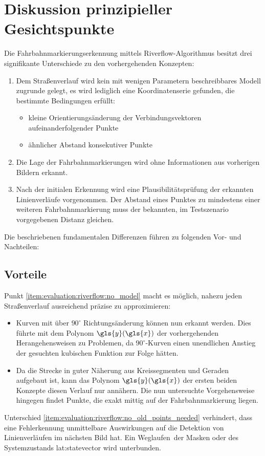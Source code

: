 \section{Diskussion prinzipieller Gesichtspunkte \dcsecondauthorshort} 
Die Fahrbahnmarkierungserkennung mittels Riverflow-Algorithmus besitzt drei signifikante Unterschiede zu den vorhergehenden Konzepten:
\begin{enumerate}
\item \label{item:evaluation:riverflow:no_model}
Dem Straßenverlauf wird kein mit wenigen Parametern beschreibbares Modell zugrunde gelegt, es wird lediglich eine Koordinatenserie gefunden, die bestimmte Bedingungen erfüllt:
\begin{itemize}
\item kleine Orientierungsänderung der Verbindungsvektoren aufeinanderfolgender Punkte
\item ähnlicher Abstand konsekutiver Punkte
\end{itemize}
\item \label{item:evaluation:riverflow:no_old_points_needed}
Die Lage der Fahrbahnmarkierungen wird ohne Informationen aus vorherigen Bildern erkannt.
\item \label{item:evaluation:riverflow:verification}
Nach der initialen Erkennung wird eine Plausibilitätsprüfung der erkannten Linienverläufe vorgenommen. Der Abstand eines Punktes zu mindestens einer weiteren Fahrbahnmarkierung muss der bekannten, im Testszenario vorgegebenen Distanz gleichen. 
\end{enumerate}
Die beschriebenen fundamentalen Differenzen führen zu folgenden Vor- und Nachteilen:

\subsection{Vorteile}
Punkt \ref{item:evaluation:riverflow:no_model} macht es möglich, nahezu jeden Straßenverlauf ausreichend präzise zu approximieren:
\begin{itemize} 
\item
Kurven mit über \(90^{\circ}\) Richtungsänderung können nun erkannt werden. Dies führte mit dem Polynom \(\gls{y}(\gls{x})\) der vorhergehenden Herangehensweisen zu Problemen, da \(90^{\circ}\)-Kurven einen unendlichen Anstieg der gesuchten kubischen Funktion zur Folge hätten.
\item
Da die Strecke in guter Näherung aus Kreissegmenten und Geraden aufgebaut ist, kann das  Polynom \(\gls{y}(\gls{x})\) der ersten beiden Konzepte diesen Verlauf nur annähern. Die nun untersuchte Vorgehensweise hingegen findet Punkte, die exakt mittig auf der Fahrbahnmarkierung liegen.
\end{itemize}
Unterschied \ref{item:evaluation:riverflow:no_old_points_needed} verhindert, dass eine Fehlerkennung unmittelbare Auswirkungen auf die Detektion von Linienverläufen im nächsten Bild hat. Ein \glqq Weglaufen\grqq\ der Masken oder des Systemzustands \gls{lat:statevector} wird unterbunden.

